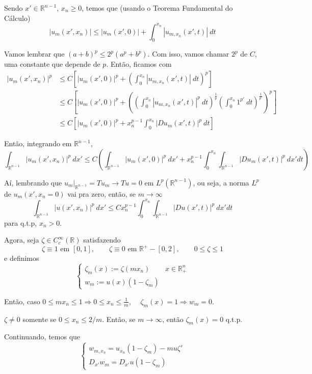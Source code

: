 \documentclass[11pt]{article}
\newcommand{\R}{\mathbb{R}}
\begin{document}
Sendo $ x' \in \R^{n-1} $, $ x_n\geq0 $, temos que (usando o Teorema Fundamental do Cálculo) \[ \left| u_m(x', x_n) \right| \leq | u_m(x',0) | + \int_0^{x_n} |u_{m,x_n}(x',t)| \ dt   \] 

Vamos lembrar que \( (a+b)^p \leq 2^p (a^p + b^p) \). Com isso, vamos chamar \( 2^p \) de $C$, uma constante que depende de $p$. Então, ficamos com \begin{align*}
	\left| u_m(x', x_n) \right|^p &\leq C \left[ | u_m(x',0) |^p + \left( \int_0^{x_n} |u_{m,x_n}(x',t)| \ dt \right)^p \right] \\
	&\leq C \left[ | u_m(x',0) |^p + \left( \left(\int_0^{x_n} |u_{m,x_n}(x',t)|^p \ dt\right)^{\frac{1}{p}} \left(\int_0^{x_n}1^{p'}\ dt\right)^{\frac{1}{p'}}  \right)^p \right] \\
	&\leq C\left[ | u_m(x',0) |^p + x_n^{p-1} \int_0^{x_n} |Du_{m}(x',t)|^{p}\ dt \right]
\end{align*}



Então, integrando em $\R^{n-1}$, \[ \int_{\R^{n-1}} | u_m(x',x_n) |^p\ dx' \leq C \left(  \int_{\R^{n-1}} | u_m(x',0) |^p \ dx' + x_n^{p-1} \int_0^{x_n} \int_{\R^{n-1}} | Du_m(x',t)|^p\ dx' dt  \right)\]

Aí, lembrando que $ u_m |_{\R^{n-1}} = Tu_m \rightarrow Tu=0 \text{ em } L^p(\R^{n-1})$, ou seja, a norma $L^p$ de $u_m(x',x_n=0)$ vai pra zero, então, se $m \rightarrow \infty$ \[  \int_{\R^{n-1}} | u(x',x_n) |^p\ dx' \leq C  x_n^{p-1} \int_0^{x_n} \int_{\R^{n-1}} | Du(x',t)|^p\ dx' dt  \] para q.t.p, $x_n>0$.


Agora, seja $\zeta \in C^\infty_c(\R)$ satisfazendo \[ \zeta \equiv 1 \text{ em } [0,1], \qquad \zeta \equiv 0 \text{ em } \R^+ - [0,2], \qquad 0 \leq \zeta \leq 1 \] e definimos \[ \begin{cases}
	\zeta_m(x) := \zeta (mx_n) & x \in \R^n_+ \\
	w_m := u(x)(1 - \zeta_m)
\end{cases} \]

Então, caso $ 0 \leq mx_n \leq 1 \Rightarrow 0 \leq x_n \leq \frac{1}{m} $, $\quad \zeta_m(x)=1 \Rightarrow w_m=0$.

$ \zeta \neq 0  $ somente se $ 0 \leq x_n \leq 2/m $. Então, se $ m \rightarrow \infty $, então $\zeta_m(x) = 0 $ q.t.p.

Continuando, temos que \[ \begin{cases}
	w_{m,x_n}=u_{x_n}(1 - \zeta_m) - mu\zeta' \\
	D_{x'}w_m = D_{x'}u(1-\zeta_m)
\end{cases} \]
\end{document}
